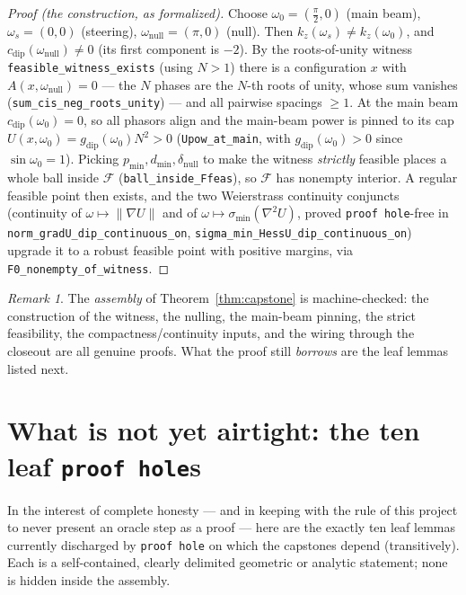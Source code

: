 \documentclass[11pt]{article}
\theoremstyle{plain}
\theoremstyle{definition}
\theoremstyle{remark}
\newtheorem{remark}[theorem]{Remark}
\newcommand{\cvec}{c}                 %
\newcommand{\Af}{A}                   %
\newcommand{\Upat}{U}                 %
\newcommand{\gain}{g}                 %
\newcommand{\Ffeas}{\mathcal{F}}      %
\newcommand{\grad}{\nabla}
\newcommand{\sigmin}{\sigma_{\min}}
\newcommand{\code}[1]{\texttt{\small #1}}
\newcommand{\norm}[1]{\lVert #1 \rVert}
\begin{document}
\begin{proof}[Proof (the construction, as formalized)]
Choose $\omega_0=(\tfrac\pi2,0)$ (main beam), $\omega_s=(0,0)$ (steering),
$\omega_{\mathrm{null}}=(\pi,0)$ (null).  Then $k_z(\omega_s)\ne k_z(\omega_0)$,
and $\cvec_{\mathrm{dip}}(\omega_{\mathrm{null}})\ne0$ (its first component is
$-2$).  By the roots-of-unity witness \code{feasible\_witness\_exists}
(using $N>1$) there is a configuration $x$ with
$\Af(x,\omega_{\mathrm{null}})=0$ --- the $N$ phases are the $N$-th roots of unity,
whose sum vanishes (\code{sum\_cis\_neg\_roots\_unity}) --- and all pairwise
spacings $\ge1$.  At the main beam $\cvec_{\mathrm{dip}}(\omega_0)=0$, so all
phasors align and the main-beam power is pinned to its cap
$\Upat(x,\omega_0)=\gain_{\mathrm{dip}}(\omega_0)N^2>0$ (\code{Upow\_at\_main},
with $\gain_{\mathrm{dip}}(\omega_0)>0$ since $\sin\omega_0=1$).  Picking
$p_{\min},d_{\min},\delta_{\mathrm{null}}$ to make the witness \emph{strictly}
feasible places a whole ball inside $\Ffeas$ (\code{ball\_inside\_Ffeas}), so
$\Ffeas$ has nonempty interior.  A regular feasible point then exists, and the
two Weierstrass continuity conjuncts (continuity of
$\omega\mapsto\norm{\grad\Upat}$ and of
$\omega\mapsto\sigmin(\grad^2\Upat)$, proved \code{proof hole}-free in
\code{norm\_gradU\_dip\_continuous\_on}, \code{sigma\_min\_HessU\_dip\_continuous\_on})
upgrade it to a robust feasible point with positive margins, via
\code{F0\_nonempty\_of\_witness}.
\end{proof}

\begin{remark}
The \emph{assembly} of Theorem~\ref{thm:capstone} is machine-checked: the
construction of the witness, the nulling, the main-beam pinning, the strict
feasibility, the compactness/continuity inputs, and the wiring through the
closeout are all genuine proofs.  What the proof still \emph{borrows} are the
leaf lemmas listed next.
\end{remark}

\section{What is not yet airtight: the ten leaf \texttt{proof hole}s}\label{sec:holes}

In the interest of complete honesty --- and in keeping with the rule of this
project to never present an oracle step as a proof --- here are the exactly ten
leaf lemmas currently discharged by \code{proof hole} on which the capstones depend
(transitively).  Each is a self-contained, clearly delimited geometric or
analytic statement; none is hidden inside the assembly.
\end{document}
